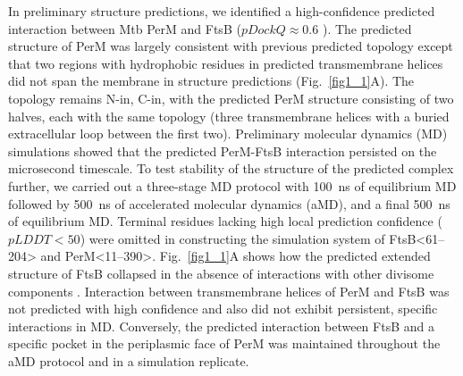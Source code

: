\documentclass[twocolumn,pdflatex,sn-nature]{sn-jnl}%
\def\textsuperscript#1{<#1>}%
\newcommand\mtb{Mtb}
\begin{document}
In preliminary structure predictions, we identified a high-confidence predicted interaction between \mtb{} PerM and FtsB ($pDockQ \approx 0.6$ \citep{bryantImprovedPredictionProteinprotein2022}).
The predicted structure of PerM was largely consistent with previous predicted topology \citep{goodsmithDisruptionTuberculosisMembrane2015} except that two regions with hydrophobic residues in predicted transmembrane helices did not span the membrane in structure predictions (Fig.~\ref{fig1_1}A).
The topology remains N-in, C-in, with the predicted PerM structure consisting of two halves, each with the same topology (three transmembrane helices with a buried extracellular loop between the first two).
Preliminary molecular dynamics (MD) simulations showed that the predicted PerM-FtsB interaction persisted on the microsecond timescale.
To test stability of the structure of the predicted complex further, we carried out a three-stage MD protocol with \qty{100}{\ns} of equilibrium MD followed by \qty{500}{\ns} of accelerated molecular dynamics (aMD), and a final \qty{500}{\ns} of equilibrium MD.
Terminal residues lacking high local prediction confidence ($pLDDT < 50$) were omitted in constructing the simulation system of FtsB\textsuperscript{61--204} and PerM\textsuperscript{11--390}.
Fig.~\ref{fig1_1}A shows how the predicted extended structure of FtsB collapsed in the absence of interactions with other divisome components \citep{brittonConformationalChangesEssential2023,cravenModelInteractionsFtsQLB2022,attaibiUpdatedModelDivisome2022,kashammerCryoEMStructureBacterial2023}.
Interaction between transmembrane helices of PerM and FtsB was not predicted with high confidence and also did not exhibit persistent, specific interactions in MD.
Conversely, the predicted interaction between FtsB and a specific pocket in the periplasmic face of PerM was maintained throughout the aMD protocol and in a simulation replicate.
\end{document}
